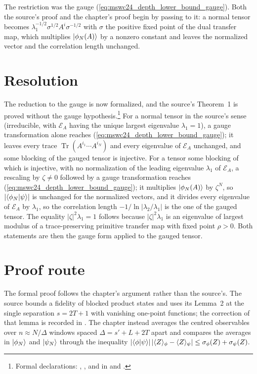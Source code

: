 \documentclass{article}
\begin{document}
The restriction was the gauge (\ref{eq:mswc24_depth_lower_bound_gauge}). Both
the source's proof and the chapter's proof begin by passing to it: a normal
tensor becomes $\lambda_1^{-1/2}\sigma^{1/2}A^i\sigma^{-1/2}$ with $\sigma$ the
positive fixed point of the dual transfer map, which multiplies
$|\phi_N(A)\rangle$ by a nonzero constant and leaves the normalized vector and
the correlation length unchanged.

\section{Resolution}
The reduction to the gauge is now formalized, and the source's Theorem~1 is
proved without the gauge hypothesis.\footnote{Formal declarations:
    ,
    ,
     and
     in
     and
    .}
For a normal tensor in the source's sense (irreducible, with $\mathcal E_A$
having the unique largest eigenvalue $\lambda_1=1$), a gauge transformation
alone reaches (\ref{eq:mswc24_depth_lower_bound_gauge}); it leaves every trace
$\operatorname{Tr}(A^{i_1}\cdots A^{i_N})$ and every eigenvalue of
$\mathcal E_A$ unchanged, and some blocking of the gauged tensor is injective.
For a tensor some blocking of which is injective, with no normalization of the
leading eigenvalue $\lambda_1$ of $\mathcal E_A$, a rescaling by
$\zeta\ne0$ followed by a gauge transformation reaches
(\ref{eq:mswc24_depth_lower_bound_gauge}); it multiplies $|\phi_N(A)\rangle$ by
$\zeta^N$, so $\lvert\langle \phi_N | \psi \rangle\rvert$ is unchanged for the
normalized vectors, and it divides every eigenvalue of $\mathcal E_A$ by
$\lambda_1$, so the correlation length $-1/\ln\lvert\lambda_2/\lambda_1\rvert$
is the one of the gauged tensor. The equality $\lvert\zeta\rvert^2\lambda_1=1$
follows because $\lvert\zeta\rvert^2\lambda_1$ is an eigenvalue of largest
modulus of a trace-preserving primitive transfer map with fixed point $\rho>0$.
Both statements are then the gauge form applied to the gauged tensor.

\section{Proof route}
The formal proof follows the chapter's argument rather than the source's. The
source bounds a fidelity of blocked product states and uses its Lemma~2 at the
single separation $s=2T+1$ with vanishing one-point functions; the correction
of that lemma is recorded in
. The
chapter instead averages the centred observables over $n\approx N/\Delta$
windows spaced $\Delta=s'+L+2T$ apart and compares the averages in
$|\phi_N\rangle$ and $|\psi_N\rangle$ through the inequality
$\lvert\langle \phi | \psi \rangle\rvert\,\lvert\langle Z\rangle_\phi-\langle
    Z\rangle_\psi\rvert\le\sigma_\phi(Z)+\sigma_\psi(Z)$.



\end{document}
